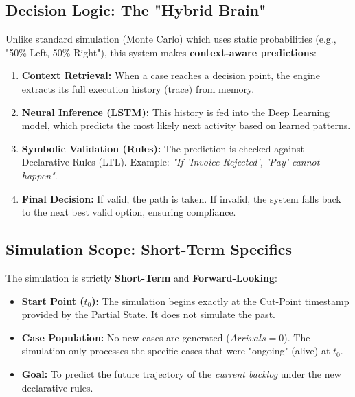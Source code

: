 \documentclass[a4paper]{article}
\begin{document}
\subsection{Decision Logic: The "Hybrid Brain"}
Unlike standard simulation (Monte Carlo) which uses static probabilities (e.g., "50\% Left, 50\% Right"), this system makes \textbf{context-aware predictions}:
\begin{enumerate}
    \item \textbf{Context Retrieval:} When a case reaches a decision point, the engine extracts its full execution history (trace) from memory.
    \item \textbf{Neural Inference (LSTM):} This history is fed into the Deep Learning model, which predicts the most likely next activity based on learned patterns.
    \item \textbf{Symbolic Validation (Rules):} The prediction is checked against Declarative Rules (LTL). Example: \textit{"If 'Invoice Rejected', 'Pay' cannot happen"}.
    \item \textbf{Final Decision:} If valid, the path is taken. If invalid, the system falls back to the next best valid option, ensuring compliance.
\end{enumerate}

\subsection{Simulation Scope: Short-Term Specifics}
The simulation is strictly \textbf{Short-Term} and \textbf{Forward-Looking}:
\begin{itemize}
    \item \textbf{Start Point ($t_0$):} The simulation begins exactly at the Cut-Point timestamp provided by the Partial State. It does not simulate the past.
    \item \textbf{Case Population:} No new cases are generated ($Arrivals = 0$). The simulation only processes the specific cases that were "ongoing" (alive) at $t_0$.
    \item \textbf{Goal:} To predict the future trajectory of the \textit{current backlog} under the new declarative rules.
\end{itemize}
\end{document}
